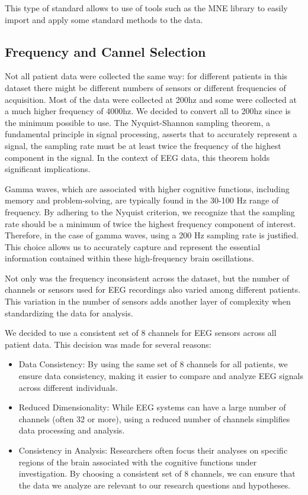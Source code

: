 \documentclass{article}
\begin{document}
This type of standard allows to use of tools such as the MNE library to easily import and apply some standard methods to the data.

\subsection{Frequency and Cannel Selection}
Not all patient data were collected the same way: for different patients in this dataset there might be different numbers of sensors or different frequencies of acquisition.
Most of the data were collected at 200hz and some were collected at a much higher frequency of 4000hz. We decided to convert all to 200hz since is the minimum possible to use.
The Nyquist-Shannon sampling theorem, a fundamental principle in signal processing, asserts that to accurately represent a signal, the sampling rate must be at least twice the frequency of the highest component in the signal. In the context of EEG data, this theorem holds significant implications.

Gamma waves, which are associated with higher cognitive functions, including memory and problem-solving, are typically found in the 30-100 Hz range of frequency. By adhering to the Nyquist criterion, we recognize that the sampling rate should be a minimum of twice the highest frequency component of interest. Therefore, in the case of gamma waves, using a 200 Hz sampling rate is justified. This choice allows us to accurately capture and represent the essential information contained within these high-frequency brain oscillations.

Not only was the frequency inconsistent across the dataset, but the number of channels or sensors used for EEG recordings also varied among different patients. This variation in the number of sensors adds another layer of complexity when standardizing the data for analysis.

We decided to use a consistent set of 8 channels for EEG sensors across all patient data. This decision was made for several reasons:
\begin{itemize}
    \item Data Consistency: By using the same set of 8 channels for all patients, we ensure data consistency, making it easier to compare and analyze EEG signals across different individuals.
    \item Reduced Dimensionality: While EEG systems can have a large number of channels (often 32 or more), using a reduced number of channels simplifies data processing and analysis.
    \item Consistency in Analysis: Researchers often focus their analyses on specific regions of the brain associated with the cognitive functions under investigation. By choosing a consistent set of 8 channels, we can ensure that the data we analyze are relevant to our research questions and hypotheses.
\end{itemize}
\end{document}
